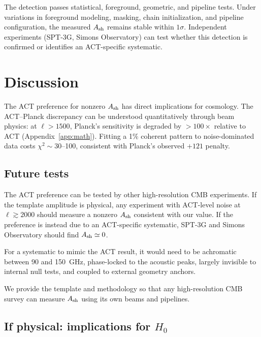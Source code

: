 \documentclass[twocolumn,showpacs,preprintnumbers,amsmath,amssymb,prd]{revtex4-2}
\begin{document}
The detection passes statistical, foreground, geometric, and pipeline 
tests. Under variations in foreground modeling, masking, chain initialization, 
and pipeline configuration, the measured $A_{\rm sh}$ remains stable within 
$1\sigma$. Independent experiments (SPT-3G, Simons Observatory) can test 
whether this detection is confirmed or identifies an ACT-specific systematic.

\section{Discussion}
\label{sec:discussion}

The ACT preference for nonzero $A_{\rm sh}$ has direct implications for 
cosmology. The ACT--Planck discrepancy can be understood quantitatively 
through beam physics: at $\ell > 1500$, Planck's sensitivity is degraded 
by $>100\times$ relative to ACT (Appendix~\ref{app:math}). Fitting a 1\% 
coherent pattern to noise-dominated data costs $\chi^2 \sim 30$--100, 
consistent with Planck's observed $+121$ penalty.

\subsection{Future tests}

The ACT preference can be tested by other high-resolution CMB experiments. 
If the template amplitude is physical, any experiment with ACT-level noise 
at $\ell \gtrsim 2000$ should measure a nonzero $A_{\rm sh}$ consistent 
with our value. If the preference is instead due to an ACT-specific 
systematic, SPT-3G and Simons Observatory should find $A_{\rm sh} \simeq 0$.

For a systematic to mimic the ACT result, it would need to be achromatic 
between 90 and 150~GHz, phase-locked to the acoustic peaks, largely 
invisible to internal null tests, and coupled to external geometry anchors.

We provide the template and methodology so that any high-resolution CMB 
survey can measure $A_{\rm sh}$ using its own beams and pipelines.

\subsection{If physical: implications for $H_0$}
\end{document}
